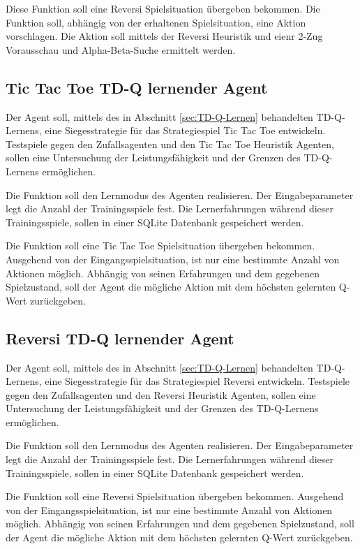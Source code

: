 Diese Funktion soll eine Reversi Spielsituation übergeben bekommen. Die Funktion soll, abhängig von der erhaltenen Spielsituation, eine Aktion vorschlagen. Die Aktion soll mittels der Reversi Heuristik und eienr 2-Zug Vorausschau und Alpha-Beta-Suche ermittelt werden.

\subsection{Tic Tac Toe TD-Q lernender Agent}
Der Agent soll, mittels des in Abschnitt \ref{sec:TD-Q-Lernen} behandelten TD-Q-Lernens, eine Siegesstrategie für das Strategiespiel Tic Tac Toe entwickeln. Testspiele gegen den Zufallsagenten und den Tic Tac Toe Heuristik Agenten, sollen eine Untersuchung der Leistungsfähigkeit und der Grenzen des TD-Q-Lernens ermöglichen.

Die Funktion soll den Lernmodus des Agenten realisieren. Der Eingabeparameter legt die Anzahl der Trainingsspiele fest. Die Lernerfahrungen während dieser Trainingsspiele, sollen in einer SQLite Datenbank gespeichert werden.

Die Funktion soll eine Tic Tac Toe Spielsituation übergeben bekommen. Ausgehend von der Eingangsspielsituation, ist nur eine bestimmte Anzahl von Aktionen möglich. Abhängig von seinen Erfahrungen und dem gegebenen Spielzustand, soll der Agent die mögliche Aktion mit dem höchsten gelernten Q-Wert zurückgeben.

\subsection{Reversi TD-Q lernender Agent}
Der Agent soll, mittels des in Abschnitt \ref{sec:TD-Q-Lernen} behandelten TD-Q-Lernens, eine Siegesstrategie für das Strategiespiel Reversi entwickeln. Testspiele gegen den Zufallsagenten und den Reversi Heuristik Agenten, sollen eine Untersuchung der Leistungsfähigkeit und der Grenzen des TD-Q-Lernens ermöglichen.

Die Funktion soll den Lernmodus des Agenten realisieren. Der Eingabeparameter legt die Anzahl der Trainingsspiele fest. Die Lernerfahrungen während dieser Trainingsspiele, sollen in einer SQLite Datenbank gespeichert werden.

Die Funktion soll eine Reversi Spielsituation übergeben bekommen. Ausgehend von der Eingangsspielsituation, ist nur eine bestimmte Anzahl von Aktionen möglich. Abhängig von seinen Erfahrungen und dem gegebenen Spielzustand, soll der Agent die mögliche Aktion mit dem höchsten gelernten Q-Wert zurückgeben.

